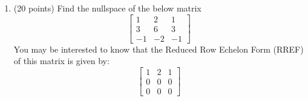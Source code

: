\documentclass[12pt, a4paper]{article}
\theoremstyle{break}
\begin{document}
\begin{enumerate}
\item (20 points) Find the nullspace of the below matrix
\begin{equation}
\begin{bmatrix}
1 & 2 & 1 \\
3&6&3 \\
-1&-2&-1
\end{bmatrix} \nonumber
\end{equation}
You may be interested to know that the Reduced Row Echelon Form (RREF) of this matrix is given by:
\begin{equation}
\begin{bmatrix}
1 & 2 & 1 \\
0&0&0 \\
0&0&0
\end{bmatrix} \nonumber
\end{equation}
\newpage







\end{enumerate}
\end{document}
